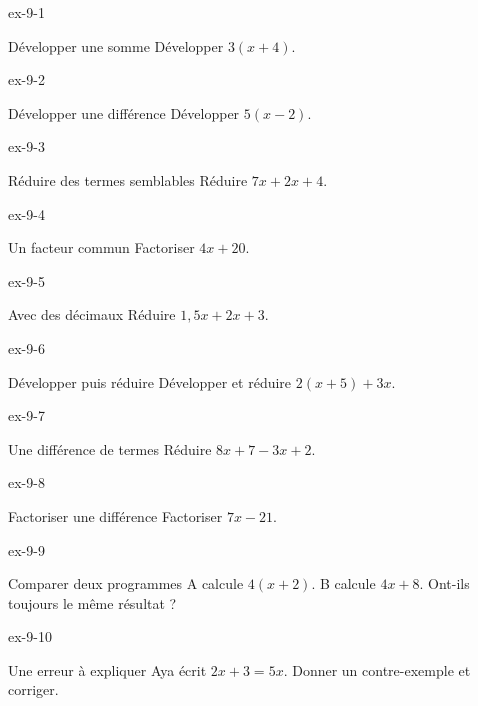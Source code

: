 \clearpage{}
\begin{blocLivre}{ex-9-1}\begin{exercice}[1]{Développer une somme}
Développer $3(x+4)$.
\end{exercice}\end{blocLivre}
\begin{blocLivre}{ex-9-2}\begin{exercice}[1]{Développer une différence}
Développer $5(x-2)$.
\end{exercice}\end{blocLivre}
\begin{blocLivre}{ex-9-3}\begin{exercice}[1]{Réduire des termes semblables}
Réduire $7x+2x+4$.
\end{exercice}\end{blocLivre}
\begin{blocLivre}{ex-9-4}\begin{exercice}[1]{Un facteur commun}
Factoriser $4x+20$.
\end{exercice}\end{blocLivre}
\begin{blocLivre}{ex-9-5}\begin{exercice}[1]{Avec des décimaux}
Réduire $1{,}5x+2x+3$.
\end{exercice}\end{blocLivre}

\begin{blocLivre}{ex-9-6}\begin{exercice}[2]{Développer puis réduire}
Développer et réduire $2(x+5)+3x$.
\end{exercice}\end{blocLivre}
\begin{blocLivre}{ex-9-7}\begin{exercice}[2]{Une différence de termes}
Réduire $8x+7-3x+2$.
\end{exercice}\end{blocLivre}
\begin{blocLivre}{ex-9-8}\begin{exercice}[2]{Factoriser une différence}
Factoriser $7x-21$.
\end{exercice}\end{blocLivre}
\begin{blocLivre}{ex-9-9}\begin{exercice}[2]{Comparer deux programmes}
A calcule $4(x+2)$. B calcule $4x+8$. Ont-ils toujours le même résultat ?
\end{exercice}\end{blocLivre}
\begin{blocLivre}{ex-9-10}\begin{exercice}[2]{Une erreur à expliquer}
Aya écrit $2x+3=5x$. Donner un contre-exemple et corriger.
\end{exercice}\end{blocLivre}

